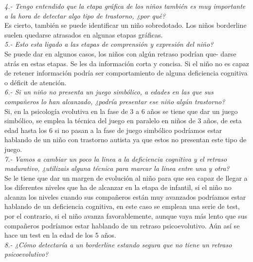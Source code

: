\documentclass[letterpaper,12pt]{article}
\begin{document}
\textit{4.- Tengo entendido que la etapa gráfica de los niños también es muy
importante a la hora de detectar algo tipo de trastorno, ¿por qué?} \\

Es cierto, también se puede identificar un niño sobredotado. Los niños
borderline suelen quedarse atrasados en algunas etapas gráficas. \\

\textit{5.- Esto esta ligado a las etapas de comprensión y expresión del niño?} \\
Se puede dar en algunos casos, los niños con algún retraso podrían que-
darse atrás en estas etapas. Se les da información corta y concisa. Si el niño
no es capaz de retener información podría ser comportamiento de alguna
deficiencia cognitiva o déficit de atención. \\

\textit{6.- Si un niño no presenta un juego simbólico, a edades en las que sus
compañeros lo han alcanzado, ¿podría presentar ese niño algún trastorno?} \\

Si, en la psicología evolutiva en la fase de 3 a 6 años se tiene que dar un
juego simbólico, se emplea la técnica del juego en paralelo en niños de 3 años, de esta edad hasta los 6 si no pasan a la fase de juego simbólico podríamos estar hablando de un niño con trastorno autista ya que estos no presentan este tipo de juego. \\

\textit{7.- Vamos a cambiar un poco la linea a la deficiencia cognitiva y el retraso madurativo, ¿utilizais alguna técnica para marcar la linea entre una y otra?} \\

Se le tiene que dar un margen de evolución al niño para que sea capaz
de llegar a los diferentes niveles que ha de alcanzar en la etapa de infantil, si el niño no alcanza los niveles cuando sus compañeros están muy avanzados
podríamos estar hablando de un deficiencia cognitiva, en este caso se emplean
una serie de test, por el contrario, si el niño avanza favorablemente, aunque
vaya más lento que sus compañeros podríamos estar hablando de un retraso
psicoevolutivo.
Aún así se hace un test en la edad de los 5 años. \\

\textit{8.- ¿Cómo detectaría a un borderline estando segura que no tiene un retraso psicoevolutivo?} \\
\end{document}
